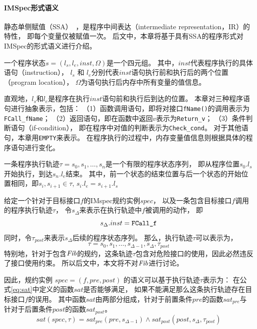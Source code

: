 \paragraph{IMSpec形式语义}
静态单侧赋值（SSA）~\cite{ssa}，是程序中间表达（intermediate representation，IR）的特性，
即每个变量仅被赋值一次。
后文中，本章将基于具有SSA的程序形式对IMSpec的形式语义进行介绍。

\begin{definition}[程序状态]
	一个程序状态$s = (l_s, l_e, inst, \Omega)$是一个四元组。
	其中，$inst$代表程序执行的具体语句（instruction），
	$l_s$ 和 $l_e$分别代表$inst$语句执行前和执行后的两个位置（program location）， 
	$\Omega$为语句执行后内存中所有变量的值信息。
\end{definition}

直观地，$l_s$和$l_e$是程序在执行$inst$语句前和执行后到达的位置。
本章对三种程序语句进行抽象表示，包括：
（1）函数调用语句，即将对接口\texttt{fName()}的调用表示为\texttt{FCall\_fName}；
（2）返回语句，即在函数中返回$v$表示为\texttt{Return\_v}；
（3）条件判断语句（if-condition），
即在程序中对值的判断表示为\texttt{Check\_cond}。
对于其他语句，本章用\texttt{EMPTY}来表示。
在程序执行的过程中，内存变量值信息则根据具体的程序语句进行变化。

\begin{definition}[执行轨迹]
	一条程序执行轨迹$\tau = s_0, s_1, \dots, s_n$是一个有限的程序状态序列，
	即从程序位置$s_0.l_s$开始执行，到达$s_n.l_e$结束。
	其中，前一个状态的结束位置与后一个状态的开始位置相同，即$s_i, s_{i+1} \in \tau$, $s_i.l_e = s_{i+1}.l_s$
\end{definition}

给定一个针对于目标接口$f$的IMspec规约实例$\mathit{spec}$，
以及一条包含目标接口$f$调用的程序执行轨迹$\tau$，
令$s_{\Delta}$来表示在执行轨迹中$f$被调用的动作，
即$$s_{\Delta}.inst = \text{\texttt{FCall\_f}}$$
同时，令$\tau_{post}$来表示$s_{\Delta}$后续的程序状态序列。
那么，执行轨迹$\tau$可以表示为，
$$\tau = s_0, s_1, \dots, s_{\Delta-1}, s_{\Delta}, \tau_{post}$$
特别地，针对于包含$\mathit{Fib}$的规约，这条轨迹$\tau$包含对危险接口的使用，因此必然违反了接口使用约束。
所以后文中，本文将不对$\mathit{Fib}$进行讨论。

因此，规约实例
$\mathit{spec} = (f, \mathit{pre}, \mathit{post})$
的语义可以基于执行轨迹$\tau$表示为：
在公式\ref{eq:sat}中定义的函数$sat$是否能够满足，
如果不能满足那么这条执行轨迹存在目标接口$f$的误用。
其中函数$sat$由两部分组成，针对于前置条件$\mathit{pre}$的函数$sat_{pre}$与
针对于后置条件$\mathit{post}$的函数$sat_{post}$。
\begin{equation}
\label{eq:sat}
sat(\textit{spec}, \tau) = 
sat_{pre}(\mathit{pre},
s_{\Delta-1}) \wedge sat_{post}(\mathit{post},s_{\Delta},\tau_{post})
\end{equation}

